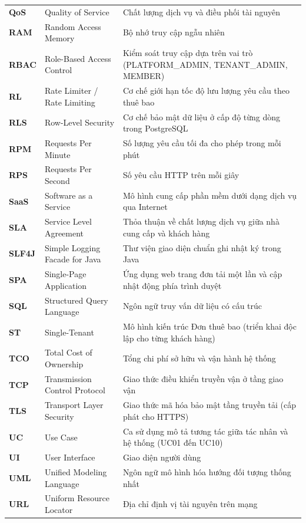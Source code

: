 \begin{longtable}{P{.14\textwidth}P{.30\textwidth}P{.47\textwidth}}
\textbf{QoS} & Quality of Service & Chất lượng dịch vụ và điều phối tài nguyên \\
\textbf{RAM} & Random Access Memory & Bộ nhớ truy cập ngẫu nhiên \\
\textbf{RBAC} & Role-Based Access Control & Kiểm soát truy cập dựa trên vai trò (PLATFORM\_ADMIN, TENANT\_ADMIN, MEMBER) \\
\textbf{RL} & Rate Limiter / Rate Limiting & Cơ chế giới hạn tốc độ lưu lượng yêu cầu theo thuê bao \\
\textbf{RLS} & Row-Level Security & Cơ chế bảo mật dữ liệu ở cấp độ từng dòng trong PostgreSQL \\
\textbf{RPM} & Requests Per Minute & Số lượng yêu cầu tối đa cho phép trong mỗi phút \\
\textbf{RPS} & Requests Per Second & Số yêu cầu HTTP trên mỗi giây \\
\textbf{SaaS} & Software as a Service & Mô hình cung cấp phần mềm dưới dạng dịch vụ qua Internet \\
\textbf{SLA} & Service Level Agreement & Thỏa thuận về chất lượng dịch vụ giữa nhà cung cấp và khách hàng \\
\textbf{SLF4J} & Simple Logging Facade for Java & Thư viện giao diện chuẩn ghi nhật ký trong Java \\
\textbf{SPA} & Single-Page Application & Ứng dụng web trang đơn tải một lần và cập nhật động phía trình duyệt \\
\textbf{SQL} & Structured Query Language & Ngôn ngữ truy vấn dữ liệu có cấu trúc \\
\textbf{ST} & Single-Tenant & Mô hình kiến trúc Đơn thuê bao (triển khai độc lập cho từng khách hàng) \\
\textbf{TCO} & Total Cost of Ownership & Tổng chi phí sở hữu và vận hành hệ thống \\
\textbf{TCP} & Transmission Control Protocol & Giao thức điều khiển truyền vận ở tầng giao vận \\
\textbf{TLS} & Transport Layer Security & Giao thức mã hóa bảo mật tầng truyền tải (cấp phát cho HTTPS) \\
\textbf{UC} & Use Case & Ca sử dụng mô tả tương tác giữa tác nhân và hệ thống (UC01 đến UC10) \\
\textbf{UI} & User Interface & Giao diện người dùng \\
\textbf{UML} & Unified Modeling Language & Ngôn ngữ mô hình hóa hướng đối tượng thống nhất \\
\textbf{URL} & Uniform Resource Locator & Địa chỉ định vị tài nguyên trên mạng \\

\end{longtable}
